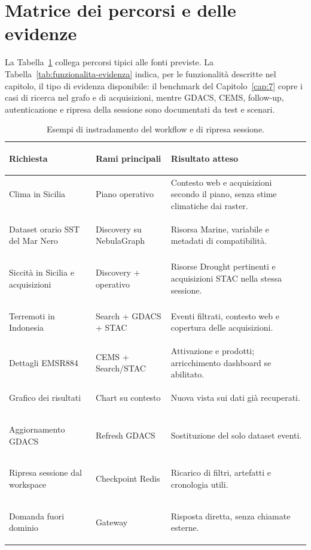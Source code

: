 \section{Matrice dei percorsi e delle evidenze}

La Tabella~\ref{tab:matrice-percorsi} collega percorsi tipici alle fonti
previste. La Tabella~\ref{tab:funzionalita-evidenza} indica, per le
funzionalità descritte nel capitolo, il tipo di evidenza disponibile: il
benchmark del Capitolo~\ref{cap:7} copre i casi di ricerca nel grafo e di
acquisizioni, mentre GDACS, CEMS, follow-up, autenticazione e ripresa della
sessione sono documentati da test e scenari.

\begin{table}[htbp]
\centering
\small
\begin{tabularx}{\textwidth}{
    >{\bfseries\raggedright\arraybackslash}p{}
    >{\raggedright\arraybackslash}p{}
    >{\raggedright\arraybackslash}X}
\toprule
Richiesta & Rami principali & Risultato atteso \\
\midrule
Clima in Sicilia &
Piano operativo &
Contesto web e acquisizioni secondo il piano, senza stime climatiche dai raster. \\
\addlinespace
Dataset orario SST del Mar Nero &
Discovery su NebulaGraph &
Risorsa Marine, variabile e metadati di compatibilità. \\
\addlinespace
Siccità in Sicilia e acquisizioni &
Discovery + operativo &
Risorse Drought pertinenti e acquisizioni STAC nella stessa sessione. \\
\addlinespace
Terremoti in Indonesia &
Search + GDACS + STAC &
Eventi filtrati, contesto web e copertura delle acquisizioni. \\
\addlinespace
Dettagli EMSR884 &
CEMS + Search/STAC &
Attivazione e prodotti; arricchimento dashboard se abilitato. \\
\addlinespace
Grafico dei risultati &
Chart su contesto &
Nuova vista sui dati già recuperati. \\
\addlinespace
Aggiornamento GDACS &
Refresh GDACS &
Sostituzione del solo dataset eventi. \\
\addlinespace
Ripresa sessione dal workspace &
Checkpoint Redis &
Ricarico di filtri, artefatti e cronologia utili. \\
\addlinespace
Domanda fuori dominio &
Gateway &
Risposta diretta, senza chiamate esterne. \\
\bottomrule
\end{tabularx}
\caption{Esempi di instradamento del workflow e di ripresa sessione.}
\label{tab:matrice-percorsi}
\end{table}

